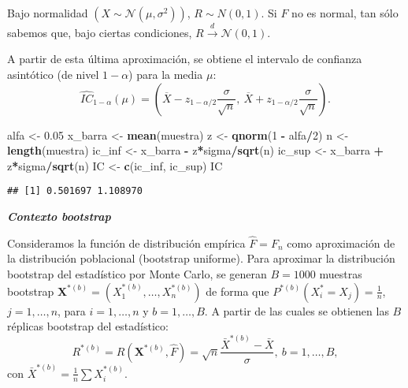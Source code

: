 \documentclass[
]{book}
\newenvironment{Shaded}{\begin{snugshade}}{\end{snugshade}}
\newcommand{\DecValTok}[1]{\textcolor[rgb]{0.00,0.00,0.81}{#1}}
\newcommand{\FloatTok}[1]{\textcolor[rgb]{0.00,0.00,0.81}{#1}}
\newcommand{\KeywordTok}[1]{\textcolor[rgb]{0.13,0.29,0.53}{\textbf{#1}}}
\newcommand{\NormalTok}[1]{#1}
\newcommand{\OperatorTok}[1]{\textcolor[rgb]{0.81,0.36,0.00}{\textbf{#1}}}
\newcommand{\StringTok}[1]{\textcolor[rgb]{0.31,0.60,0.02}{#1}}
\theoremstyle{break}
\theoremstyle{definition}
\theoremstyle{definition}
\theoremstyle{definition}
\theoremstyle{remark}
\begin{document}
Bajo normalidad \(\left( X\sim \mathcal{N}\left( \mu ,\sigma^2 \right) \right)\),
\(R\sim N\left( 0,1 \right)\). Si \(F\) no es normal, tan sólo sabemos que,
bajo ciertas condiciones,
\(R\overset{d}{\rightarrow }\mathcal{N}\left( 0, 1 \right)\).

A partir de esta última aproximación, se obtiene el intervalo de
confianza asintótico (de nivel \(1-\alpha\)) para la media \(\mu\):
\[\hat{IC}_{1-\alpha}\left(  \mu\right)  = 
\left(  \overline{X}-z_{1-\alpha/2}\dfrac{\sigma}{\sqrt{n}},\ \overline{X} 
+ z_{1-\alpha/2}\dfrac{\sigma}{\sqrt{n}} \right).\]

\begin{Shaded}
\begin{Highlighting}[]
\NormalTok{alfa <-}\StringTok{ }\FloatTok{0.05}
\NormalTok{x_barra <-}\StringTok{ }\KeywordTok{mean}\NormalTok{(muestra)}
\NormalTok{z <-}\StringTok{ }\KeywordTok{qnorm}\NormalTok{(}\DecValTok{1} \OperatorTok{-}\StringTok{ }\NormalTok{alfa}\OperatorTok{/}\DecValTok{2}\NormalTok{)}
\NormalTok{n <-}\StringTok{ }\KeywordTok{length}\NormalTok{(muestra)}
\NormalTok{ic_inf <-}\StringTok{ }\NormalTok{x_barra }\OperatorTok{-}\StringTok{ }\NormalTok{z}\OperatorTok{*}\NormalTok{sigma}\OperatorTok{/}\KeywordTok{sqrt}\NormalTok{(n)}
\NormalTok{ic_sup <-}\StringTok{ }\NormalTok{x_barra }\OperatorTok{+}\StringTok{ }\NormalTok{z}\OperatorTok{*}\NormalTok{sigma}\OperatorTok{/}\KeywordTok{sqrt}\NormalTok{(n)}
\NormalTok{IC <-}\StringTok{ }\KeywordTok{c}\NormalTok{(ic_inf, ic_sup)}
\NormalTok{IC}
\end{Highlighting}
\end{Shaded}

\begin{verbatim}
## [1] 0.501697 1.108970
\end{verbatim}

\textbf{\emph{Contexto bootstrap}}

Consideramos la función de distribución empírica \(\hat{F}=F_n\)
como aproximación de la distribución poblacional (bootstrap uniforme).
Para aproximar la distribución bootstrap del estadístico por Monte Carlo,
se generan \(B=1000\) muestras bootstrap
\(\mathbf{X}^{\ast (b)}=\left( X_1^{\ast (b)},\ldots ,X_n^{\ast (b)} \right)\)
de forma que
\(P^{\ast (b)}\left( X_i^{\ast}=X_j \right) = \frac{1}{n}\), \(j=1,\ldots ,n\), para \(i=1,\ldots, n\) y \(b=1,\ldots, B\).
A partir de las cuales se obtienen las \(B\) réplicas bootstrap del estadístico:
\[R^{\ast (b)}=R\left( \mathbf{X}^{\ast (b)},\hat{F} \right) =\sqrt{n}\frac{
\bar{X}^{\ast  (b)}-\bar{X}}{\sigma }, \ b=1,\ldots, B, \]
con \(\bar{X}^{\ast (b)} = \frac{1}{n}\sum X_i^{\ast (b)}\).
\end{document}
